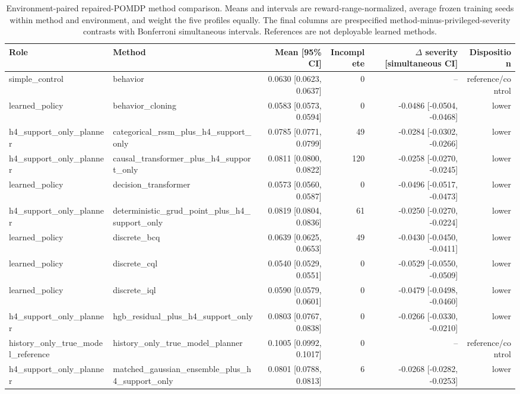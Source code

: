 \begin{table}[t]
\centering
\caption{Environment-paired repaired-POMDP method comparison. Means and intervals are reward-range-normalized, average frozen training seeds within method and environment, and weight the five profiles equally. The final columns are prespecified method-minus-privileged-severity contrasts with Bonferroni simultaneous intervals. References are not deployable learned methods.}
\label{tab:kdd213-all-methods}
\scriptsize
\begin{tabular}{llrrrr}
\toprule
Role & Method & Mean [95\% CI] & Incomplete & $\Delta$ severity [simultaneous CI] & Disposition \\
\midrule
simple\_control & behavior & 0.0630 [0.0623, 0.0637] & 0 & -- & reference/control \\
learned\_policy & behavior\_cloning & 0.0583 [0.0573, 0.0594] & 0 & -0.0486 [-0.0504, -0.0468] & lower \\
h4\_support\_only\_planner & categorical\_rssm\_plus\_h4\_support\_only & 0.0785 [0.0771, 0.0799] & 49 & -0.0284 [-0.0302, -0.0266] & lower \\
h4\_support\_only\_planner & causal\_transformer\_plus\_h4\_support\_only & 0.0811 [0.0800, 0.0822] & 120 & -0.0258 [-0.0270, -0.0245] & lower \\
learned\_policy & decision\_transformer & 0.0573 [0.0560, 0.0587] & 0 & -0.0496 [-0.0517, -0.0473] & lower \\
h4\_support\_only\_planner & deterministic\_grud\_point\_plus\_h4\_support\_only & 0.0819 [0.0804, 0.0836] & 61 & -0.0250 [-0.0270, -0.0224] & lower \\
learned\_policy & discrete\_bcq & 0.0639 [0.0625, 0.0653] & 49 & -0.0430 [-0.0450, -0.0411] & lower \\
learned\_policy & discrete\_cql & 0.0540 [0.0529, 0.0551] & 0 & -0.0529 [-0.0550, -0.0509] & lower \\
learned\_policy & discrete\_iql & 0.0590 [0.0579, 0.0601] & 0 & -0.0479 [-0.0498, -0.0460] & lower \\
h4\_support\_only\_planner & hgb\_residual\_plus\_h4\_support\_only & 0.0803 [0.0767, 0.0838] & 0 & -0.0266 [-0.0330, -0.0210] & lower \\
history\_only\_true\_model\_reference & history\_only\_true\_model\_planner & 0.1005 [0.0992, 0.1017] & 0 & -- & reference/control \\
h4\_support\_only\_planner & matched\_gaussian\_ensemble\_plus\_h4\_support\_only & 0.0801 [0.0788, 0.0813] & 6 & -0.0268 [-0.0282, -0.0253] & lower \\

\end{tabular}
\end{table}
